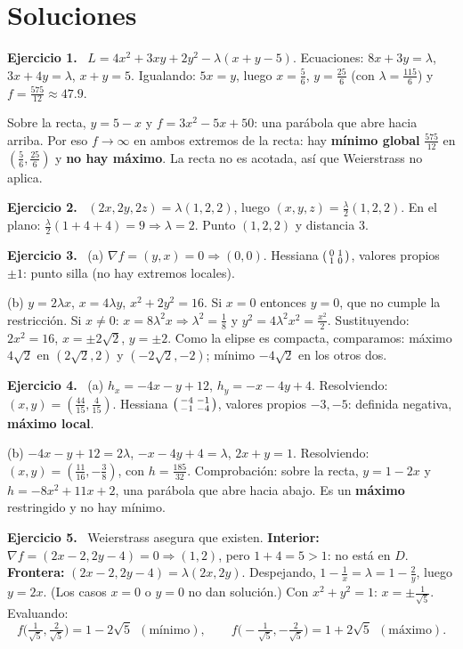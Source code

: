 \documentclass[11pt,a4paper]{article}
\newcommand{\sol}[1]{\par\medskip\noindent\textbf{Ejercicio #1.}\ }
\begin{document}
\newpage
\section{Soluciones}

\sol{1}
$L=4x^2+3xy+2y^2-\lambda(x+y-5)$. Ecuaciones: $8x+3y=\lambda$, $3x+4y=\lambda$, $x+y=5$. Igualando: $5x=y$, luego $x=\tfrac56$, $y=\tfrac{25}{6}$ (con $\lambda=\tfrac{115}{6}$) y $f=\tfrac{575}{12}\approx47.9$.

Sobre la recta, $y=5-x$ y $f=3x^2-5x+50$: una parábola que abre hacia arriba. Por eso $f\to\infty$ en ambos extremos de la recta: hay \textbf{mínimo global} $\tfrac{575}{12}$ en $(\tfrac56,\tfrac{25}6)$ y \textbf{no hay máximo}. La recta no es acotada, así que Weierstrass no aplica.

\sol{2}
$(2x,2y,2z)=\lambda(1,2,2)$, luego $(x,y,z)=\tfrac\lambda2(1,2,2)$. En el plano: $\tfrac\lambda2(1+4+4)=9\Rightarrow\lambda=2$. Punto $(1,2,2)$ y distancia $3$.

\sol{3}
(a) $\nabla f=(y,x)=0\Rightarrow(0,0)$. Hessiana $\begin{psmallmatrix}0&1\\1&0\end{psmallmatrix}$, valores propios $\pm1$: punto silla (no hay extremos locales).

(b) $y=2\lambda x$, $x=4\lambda y$, $x^2+2y^2=16$. Si $x=0$ entonces $y=0$, que no cumple la restricción. Si $x\ne0$: $x=8\lambda^2x\Rightarrow\lambda^2=\tfrac18$ y $y^2=4\lambda^2x^2=\tfrac{x^2}2$. Sustituyendo: $2x^2=16$, $x=\pm2\sqrt2$, $y=\pm2$. Como la elipse es compacta, comparamos: máximo $4\sqrt2$ en $(2\sqrt2,2)$ y $(-2\sqrt2,-2)$; mínimo $-4\sqrt2$ en los otros dos.

\sol{4}
(a) $h_x=-4x-y+12$, $h_y=-x-4y+4$. Resolviendo: $(x,y)=(\tfrac{44}{15},\tfrac4{15})$. Hessiana $\begin{psmallmatrix}-4&-1\\-1&-4\end{psmallmatrix}$, valores propios $-3,-5$: definida negativa, \textbf{máximo local}.

(b) $-4x-y+12=2\lambda$, $-x-4y+4=\lambda$, $2x+y=1$. Resolviendo: $(x,y)=(\tfrac{11}{16},-\tfrac38)$, con $h=\tfrac{185}{32}$. Comprobación: sobre la recta, $y=1-2x$ y $h=-8x^2+11x+2$, una parábola que abre hacia abajo. Es un \textbf{máximo} restringido y no hay mínimo.

\sol{5}
Weierstrass asegura que existen. \textbf{Interior:} $\nabla f=(2x-2,2y-4)=0\Rightarrow(1,2)$, pero $1+4=5>1$: no está en $D$. \textbf{Frontera:} $(2x-2,2y-4)=\lambda(2x,2y)$. Despejando, $1-\tfrac1x=\lambda=1-\tfrac2y$, luego $y=2x$. (Los casos $x=0$ o $y=0$ no dan solución.) Con $x^2+y^2=1$: $x=\pm\tfrac1{\sqrt5}$. Evaluando:
\[
f\big(\tfrac1{\sqrt5},\tfrac2{\sqrt5}\big)=1-2\sqrt5\ \ (\text{mínimo}),\qquad f\big(-\tfrac1{\sqrt5},-\tfrac2{\sqrt5}\big)=1+2\sqrt5\ \ (\text{máximo}).
\]
\end{document}
